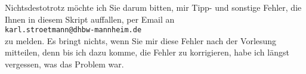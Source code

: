 Nichtsdestotrotz m\"{o}chte ich Sie darum bitten, mir Tipp- und sonstige Fehler, die Ihnen in diesem
Skript auffallen, per Email an
\\[0.2cm]
\hspace*{1.3cm}
\texttt{karl.stroetmann@dhbw-mannheim.de}
\\[0.2cm]
zu melden.  Es bringt nichts, wenn Sie mir diese Fehler nach der
Vorlesung mitteilen, denn bis ich dazu komme, die Fehler zu korrigieren, habe ich l\"{a}ngst vergessen,
was das Problem war.

